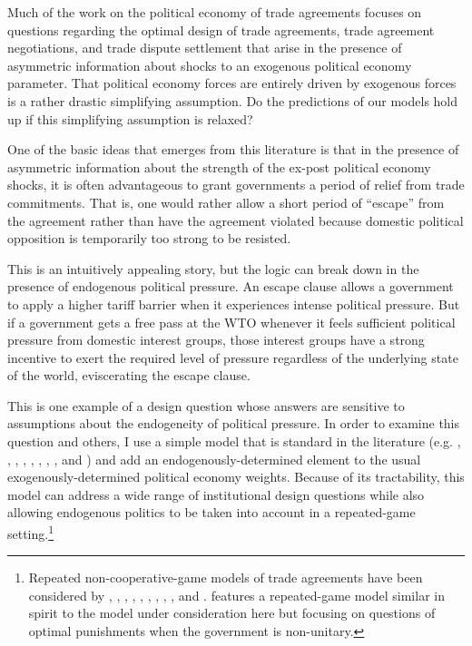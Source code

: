 Much of the work on the political economy of trade agreements focuses on questions regarding the optimal design of trade agreements, trade agreement negotiations, and trade dispute settlement that arise in the presence of asymmetric information about shocks to an exogenous political economy parameter. That political economy forces are entirely driven by exogenous forces is a rather drastic simplifying assumption. Do the predictions of our models hold up if this simplifying assumption is relaxed?

One of the basic ideas that emerges from this literature is that in the presence of asymmetric information about the strength of the ex-post political economy shocks, it is often advantageous to grant governments a period of relief from trade commitments. That is, one would rather allow a short period of ``escape'' from the agreement rather than have the agreement violated because domestic political opposition is temporarily too strong to be resisted.

This is an intuitively appealing story, but the logic can break down in the presence of endogenous political pressure. An escape clause allows a government to apply a higher tariff barrier when it experiences intense political pressure. But if a government gets a free pass at the WTO whenever it feels sufficient political pressure from domestic interest groups, those interest groups have a strong incentive to exert the required level of pressure regardless of the underlying state of the world, eviscerating the escape clause.

This is one example of a design question whose answers are sensitive to assumptions about the endogeneity of political pressure. In order to examine this question and others, I use a simple model that is standard in the literature (e.g. \Textcite{bs2001}, \Textcite{bown2002}, \Textcite{bown2004}, \Textcite{bs2005}, \Textcite{martinvergote}, \Textcite{bagwell2009}, \Textcite{beshkar2010a}, \Textcite{ms2012a}, and \Textcite{ms2013}) and add an endogenously-determined element to the usual exogenously-determined political economy weights. Because of its tractability, this model can address a wide range of institutional design questions while also allowing endogenous politics to be taken into account in a repeated-game setting.\footnote{Repeated non-cooperative-game models of trade agreements have been considered by \Textcite{mcm86,mcm89}, \Textcite{dixit1987}, \Textcite{bs1990, bs1997a, bs1997b, bs2002}, \Textcite{kovthurs}, \Textcite{maggi99}, \Textcite{coatesludema}, \Textcite{ederington}, \Textcite{rosendorff}, \Textcite{bagwell2009}, and \Textcite{park}. \Textcite{buzard2013a} features a repeated-game model similar in spirit to the model under consideration here but focusing on questions of optimal punishments when the government is non-unitary.}

